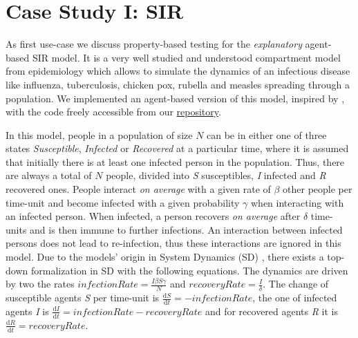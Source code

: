 \section{Case Study I: SIR}
\label{sec:case_SIR}
As first use-case we discuss property-based testing for the \textit{explanatory} agent-based SIR model. It is a very well studied and understood compartment model from epidemiology \cite{kermack_contribution_1927} which allows to simulate the dynamics of an infectious disease like influenza, tuberculosis, chicken pox, rubella and measles spreading through a population. We implemented an agent-based version of this model, inspired by \cite{macal_agent-based_2010}, with the code freely accessible from our \href{https://github.com/thalerjonathan/haskell-sir}{repository}.

In this model, people in a population of size $N$ can be in either one of three states \textit{Susceptible}, \textit{Infected} or \textit{Recovered} at a particular time, where it is assumed that initially there is at least one infected person in the population. Thus, there are always a total of $N$ people, divided into \textit{S} susceptibles, \textit{I} infected and \textit{R} recovered ones. People interact \textit{on average} with a given rate of $\beta$ other people per time-unit and become infected with a given probability $\gamma$ when interacting with an infected person. When infected, a person recovers \textit{on average} after $\delta$ time-units and is then immune to further infections. An interaction between infected persons does not lead to re-infection, thus these interactions are ignored in this model. Due to the models' origin in System Dynamics (SD) \cite{porter_industrial_1962}, there exists a top-down formalization in SD with the following equations. The dynamics are driven by two the rates $infectionRate = \frac{I \beta S \gamma}{N}$ and $recoveryRate = \frac{I}{\delta}$. The change of susceptible agents \textit{S} per time-unit is $\frac{\mathrm d S}{\mathrm d t} = -infectionRate$, the one of infected agents \textit{I} is $\frac{\mathrm d I}{\mathrm d t} = infectionRate - recoveryRate$ and for recovered agents \textit{R} it is $\frac{\mathrm d R}{\mathrm d t} = recoveryRate$.

